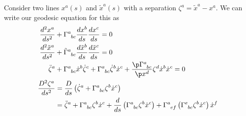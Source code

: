 \documentclass[a4paper, 11pt, normalem]{report}
\begin{document}
Consider two lines $x^a(s)$ and $\tilde{x}^a(s)$ with a separation $\zeta^a=\tilde{x}^a - x^a$.
We can write our geodesic equation for this as
\begin{align}
    \frac{d^2x^a}{ds^2} &+ \tensor{\Gamma}{^a_{bc}}\frac{dx^b}{ds} \frac{dx^c}{ds} = 0 \\
    \frac{d^2\tilde{x}^a}{ds^2} &+ \tensor{\tilde{\Gamma}}{^a_{bc}}\frac{d\tilde{x}^b}{ds}\frac{d\tilde{x}^c}{ds} = 0 \\
    \ddot{\zeta}^a &+ \tensor{\Gamma}{^a_{bc}}\dot{x}^b\dot{\zeta}^c + \tensor{\Gamma}{^a_{bc}}\dot{\zeta}^b\dot{x}^c + \frac{\p\tensor{\Gamma}{^a_{bc}}}{\p x^d} \zeta^d\dot{x}^b\dot{x}^c = 0  \\
    \frac{D^2\zeta^a}{ds^2} &= \frac{D}{ds}\left(\dot{\zeta}^a + \tensor{\Gamma}{^a_{bc}}\zeta^b\dot{x}^c\right) \\
                            &= \ddot{\zeta}^a + \tensor{\Gamma}{^a_{bc}}\zeta^b\dot{x}^c + \frac{d}{ds}\left(\tensor{\Gamma}{^a_{bc}}\zeta^b\dot{x}^c\right)+\tensor{\Gamma}{^a_{ef}}\left(\tensor{\Gamma}{^e_{bc}}\zeta^b\dot{x}^c\right)\dot{x}^f
\end{align}
\end{document}

